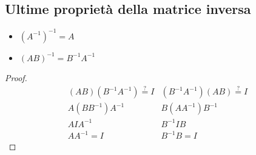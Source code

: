 \subsection{Ultime proprietà della matrice inversa}
\label{sec:ultimaproprietàdellematriciinversa}

\begin{itemize}
\item $(A^{-1})^{-1}=A$
\item $(AB)^{-1}=B^{-1}A^{-1}$
\end{itemize}
\begin{proof}
  \begin{eqnarray*}
    (AB)(B^{-1}A^{-1})\overset{?}{=}I & (B^{-1}A^{-1})(AB)\overset{?}{=}I\\
    A(BB^{-1})A^{-1} & B(AA^{-1})B^{-1}\\
    AIA^{-1} & B^{-1}IB\\
    AA^{-1} = I & B^{-1}B=I
  \end{eqnarray*}
\end{proof}